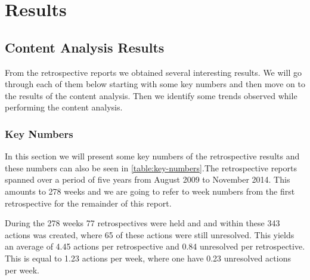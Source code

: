\chapter{Results}

\clearpage
\section{Content Analysis Results}
From the retrospective reports we obtained several interesting results. We will go through each of them below starting with some key numbers and then move on to the results of the content analysis. Then we identify some trends observed while performing the content analysis. 

\subsection{Key Numbers}
In this section we will present some key numbers of the retrospective results and these numbers can also be seen in \autoref{table:key-numbers}.The retrospective reports spanned over a period of five years from August 2009 to November 2014. This amounts to 278 weeks and we are going to refer to week numbers from the first retrospective for the remainder of this report. 
\begin{table}[!h]
	\begin{center}
	\caption{Some key numbers from the retrospectives}
	\label{table:key-numbers}
\end{center}
\end{table}
During the 278 weeks 77 retrospectives were held and and within these 343 actions was created, where 65 of these actions were still unresolved. This yields an average of 4.45 actions per retrospective and 0.84 unresolved per retrospective. This is equal to 1.23 actions per week, where one have 0.23 unresolved actions per week. 

